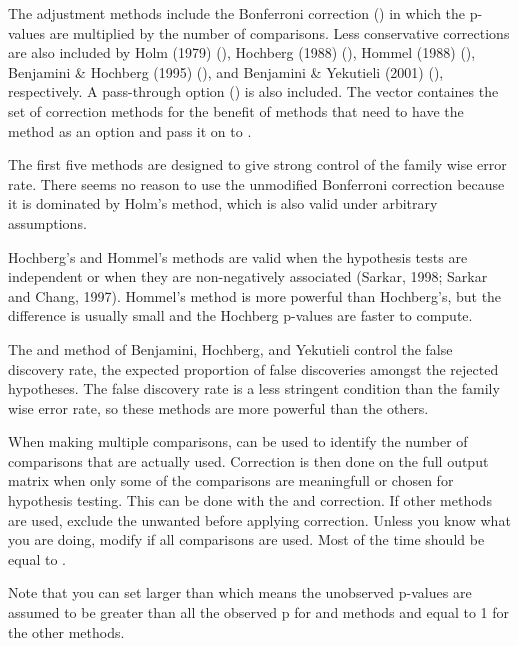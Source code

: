 \documentclass[a4paper]{book}
\begin{document}
\begin{Details}\relax
The adjustment methods include the Bonferroni correction
() in which the p-values are multiplied by the
number of comparisons.  Less conservative corrections are also
included by Holm (1979) (), Hochberg (1988)
(), Hommel (1988) (), Benjamini \&
Hochberg (1995) (), and Benjamini \& Yekutieli (2001)
(), respectively.
A pass-through option () is also included.
The  vector containes the set of correction methods
for the benefit of methods that need to have the method as an option
and pass it on to .

The first five methods are designed to give strong control of the
family wise error rate.  There seems no reason to use the unmodified
Bonferroni correction because it is dominated by Holm's method, which
is also valid under arbitrary assumptions.

Hochberg's and Hommel's methods are valid when the hypothesis tests
are independent or when they are non-negatively associated (Sarkar,
1998; Sarkar and Chang, 1997).  Hommel's method is more powerful than
Hochberg's, but the difference is usually small and the Hochberg
p-values are faster to compute.

The  and  method of Benjamini, Hochberg, and
Yekutieli control the false discovery rate, the expected proportion of
false discoveries amongst the rejected hypotheses.  The false
discovery rate is a less stringent condition than the family wise
error rate, so these methods are more powerful than the others.

When making multiple comparisons,  can be used to identify the number
of comparisons that are actually used.
Correction is then done on the full output matrix when only some of the comparisons
are meaningfull or chosen for hypothesis testing. This can be done with the 
and  correction.
If other methods are used, exclude the unwanted  before applying correction.
Unless you know what you are doing,  modify  if all comparisons are used. Most of the time 
should be equal to .

Note that you can set  larger than  which
means the unobserved p-values are assumed to be greater than all the
observed p for  and  methods and equal to 1 for
the other methods.
\end{Details}
\end{document}

